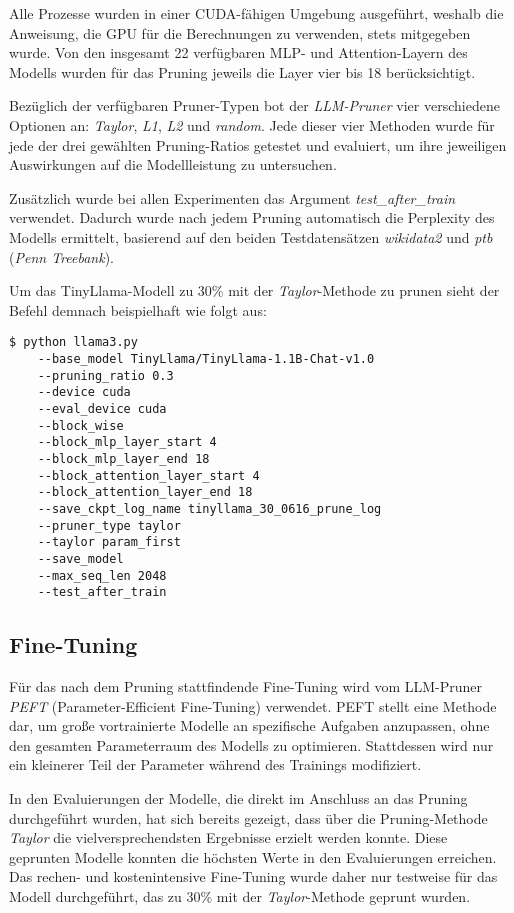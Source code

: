 Alle Prozesse wurden in einer CUDA-fähigen Umgebung ausgeführt, weshalb die
Anweisung, die GPU für die Berechnungen zu verwenden, stets mitgegeben wurde.
Von den insgesamt 22 verfügbaren MLP- und Attention-Layern des Modells wurden
für das Pruning jeweils die Layer vier bis 18 berücksichtigt.

Bezüglich der verfügbaren Pruner-Typen bot der \emph{LLM-Pruner} vier
verschiedene Optionen an: \emph{Taylor}, \emph{L1}, \emph{L2} und \emph{random}.
Jede dieser vier Methoden wurde für jede der drei gewählten Pruning-Ratios
getestet und evaluiert, um ihre jeweiligen Auswirkungen auf die Modellleistung
zu untersuchen.

Zusätzlich wurde bei allen Experimenten das Argument \emph{\-\-test\_after\_train}
verwendet. Dadurch wurde nach jedem Pruning automatisch die Perplexity des
Modells ermittelt, basierend auf den beiden Testdatensätzen \emph{wikidata2} und
\emph{ptb} (\emph{Penn Treebank}).

Um das TinyLlama-Modell zu 30\% mit der \emph{Taylor}-Methode zu prunen sieht
der Befehl demnach beispielhaft wie folgt aus:

\vspace{1em}
\begin{lstlisting}
$ python llama3.py 
    --base_model TinyLlama/TinyLlama-1.1B-Chat-v1.0
    --pruning_ratio 0.3
    --device cuda
    --eval_device cuda
    --block_wise
    --block_mlp_layer_start 4
    --block_mlp_layer_end 18
    --block_attention_layer_start 4
    --block_attention_layer_end 18
    --save_ckpt_log_name tinyllama_30_0616_prune_log
    --pruner_type taylor
    --taylor param_first
    --save_model
    --max_seq_len 2048
    --test_after_train
\end{lstlisting}

\subsection{Fine-Tuning}

Für das nach dem Pruning stattfindende Fine-Tuning wird vom LLM-Pruner
\emph{PEFT} (Parameter-Efficient Fine-Tuning) verwendet. PEFT stellt eine
Methode dar, um große vortrainierte Modelle an spezifische Aufgaben anzupassen,
ohne den gesamten Parameterraum des Modells zu optimieren. Stattdessen wird nur
ein kleinerer Teil der Parameter während des Trainings modifiziert.

In den Evaluierungen der Modelle, die direkt im Anschluss an das Pruning
durchgeführt wurden, hat sich bereits gezeigt, dass über die Pruning-Methode
\emph{Taylor} die vielversprechendsten Ergebnisse erzielt werden konnte. Diese
geprunten Modelle konnten die höchsten Werte in den Evaluierungen erreichen. Das
rechen- und kostenintensive Fine-Tuning wurde daher nur testweise für das Modell
durchgeführt, das zu 30\% mit der \emph{Taylor}-Methode geprunt wurden.

